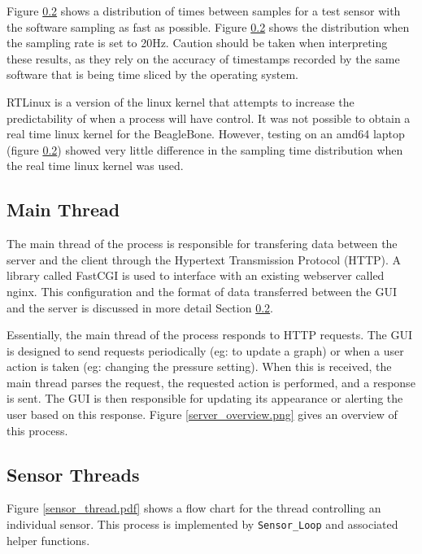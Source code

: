 Figure \ref{} shows a distribution of times between samples for a test sensor with the software sampling as fast as possible. 
Figure \ref{} shows the distribution when the sampling rate is set to 20Hz. Caution should be taken when interpreting these results, as they rely on the accuracy of timestamps recorded by the same software that is being time sliced by the operating system.

RTLinux is a version of the linux kernel that attempts to increase the predictability of when a process will have control\cite{rtlinux}. It was not possible to obtain a real time linux kernel for the BeagleBone. However, testing on an amd64 laptop (figure \ref{}) showed very little difference in the sampling time distribution when the real time linux kernel was used.





\subsection{Main Thread}

The main thread of the process is responsible for transfering data between the server and the client through the Hypertext Transmission Protocol (HTTP). A library called FastCGI is used to interface with an existing webserver called nginx\cite{nginx}. This configuration and the format of data transferred between the GUI and the server is discussed in more detail Section \ref{}.

Essentially, the main thread of the process responds to HTTP requests. The GUI is designed to send requests periodically (eg: to update a graph) or when a user action is taken (eg: changing the pressure setting). When this is received, the main thread parses the request, the requested action is performed, and a response is sent. The GUI is then responsible for updating its appearance or alerting the user based on this response. Figure \ref{server_overview.png} gives an overview of this process.


\subsection{Sensor Threads}

Figure \ref{sensor_thread.pdf} shows a flow chart for the thread controlling an individual sensor. This process is implemented by \verb/Sensor_Loop/ and associated helper functions.

